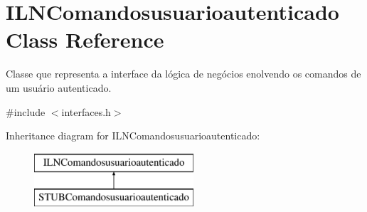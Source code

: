 \hypertarget{classILNComandosusuarioautenticado}{}\section{I\+L\+N\+Comandosusuarioautenticado Class Reference}
\label{classILNComandosusuarioautenticado}


Classe que representa a interface da lógica de negócios enolvendo os comandos de um usuário autenticado.  




{\ttfamily \#include $<$interfaces.\+h$>$}

Inheritance diagram for I\+L\+N\+Comandosusuarioautenticado\+:\begin{figure}[H]
\begin{center}
\leavevmode
\includegraphics[height=2.000000cm]{classILNComandosusuarioautenticado}
\end{center}
\end{figure}
